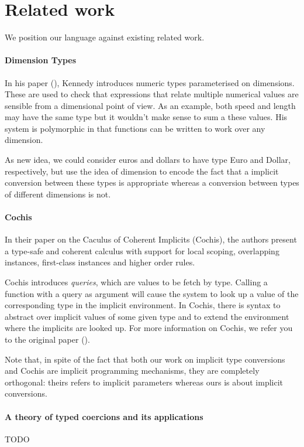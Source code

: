 \chapter{Related work}
\label{relatedwork}
We position our language against existing related work.
\subsubsection{Dimension Types}
In his paper (\cite{kennedy}), Kennedy introduces numeric types parameterised on dimensions. These are used to check that expressions that relate multiple numerical values are sensible from a dimensional point of view. As an example, both speed and length may have the same type but it wouldn't make sense to sum a these values. His system is polymorphic in that functions can be written to work over any dimension.

As new idea, we could consider euros and dollars to have type Euro and Dollar, respectively, but use the idea of dimension to encode the fact that a implicit conversion between these types is appropriate whereas a conversion between types of different dimensions is not.
\subsubsection{Cochis}
In their paper on the Caculus of Coherent Implicits (Cochis), the authors present a type-safe and coherent calculus with support for local scoping, overlapping instances, first-class instances and higher order rules.

Cochis introduces \textit{queries}, which are values to be fetch by type. Calling a function with a query as argument will cause the system to look up a value of the corresponding type in the implicit environment. In Cochis, there is syntax to abstract over implicit values of some given type and to extend the environment where the implicits are looked up. For more information on Cochis, we refer you to the original paper (\cite{cochis}).

Note that, in spite of the fact that both our work on implicit type conversions and Cochis are implicit programming mechanisms, they are completely orthogonal: theirs refers to implicit parameters whereas ours is about implicit conversions.
\subsubsection{A theory of typed coercions and its applications}
TODO \cite{swamy}

